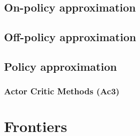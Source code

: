 \documentclass[paper=a4,fontsize=11pt]{scrartcl} %
\numberwithin{equation}{section} %
\numberwithin{figure}{section} %
\numberwithin{table}{section} %
\begin{document}
\subsection{On-policy approximation}

\subsection{Off-policy approximation}

\subsection{Policy approximation}

\subsubsection{Actor Critic Methods (Ac3)}



\section{Frontiers}


\printindex
\end{document}
